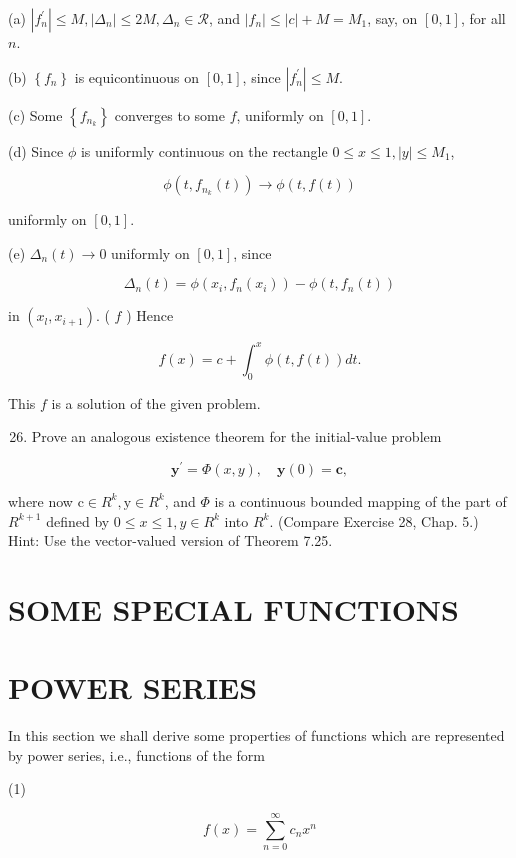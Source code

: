 \documentclass[10pt]{article}
\begin{document}
(a) $\left|f_{n}^{\prime}\right| \leq M,\left|\Delta_{n}\right| \leq 2 M, \Delta_{n} \in \mathscr{R}$, and $\left|f_{n}\right| \leq|c|+M=M_{1}$, say, on $[0,1]$, for all $n$.

(b) $\left\{f_{n}\right\}$ is equicontinuous on $[0,1]$, since $\left|f_{n}^{\prime}\right| \leq M$.

(c) Some $\left\{f_{n_{k}}\right\}$ converges to some $f$, uniformly on $[0,1]$.

(d) Since $\phi$ is uniformly continuous on the rectangle $0 \leq x \leq 1,|y| \leq M_{1}$,

$$
\phi\left(t, f_{n_{k}}(t)\right) \rightarrow \phi(t, f(t))
$$

uniformly on $[0,1]$.

(e) $\Delta_{n}(t) \rightarrow 0$ uniformly on $[0,1]$, since

$$
\Delta_{n}(t)=\phi\left(x_{i}, f_{n}\left(x_{i}\right)\right)-\phi\left(t, f_{n}(t)\right)
$$

in $\left(x_{l}, x_{i+1}\right)$. ( $f$ ) Hence

$$
f(x)=c+\int_{0}^{x} \phi(t, f(t)) d t .
$$

This $f$ is a solution of the given problem.

\begin{enumerate}
  \setcounter{enumi}{25}
  \item Prove an analogous existence theorem for the initial-value problem
\end{enumerate}

$$
\mathbf{y}^{\prime}=\Phi(x, y), \quad \mathbf{y}(0)=\mathbf{c},
$$

where now $\mathrm{c} \in R^{k}, \mathrm{y} \in R^{k}$, and $\Phi$ is a continuous bounded mapping of the part of $R^{k+1}$ defined by $0 \leq x \leq 1, y \in R^{k}$ into $R^{k}$. (Compare Exercise 28, Chap. 5.) Hint: Use the vector-valued version of Theorem 7.25.

\section{SOME SPECIAL FUNCTIONS}
\section{POWER SERIES}
In this section we shall derive some properties of functions which are represented by power series, i.e., functions of the form

(1)

$$
f(x)=\sum_{n=0}^{\infty} c_{n} x^{n}
$$
\end{document}
